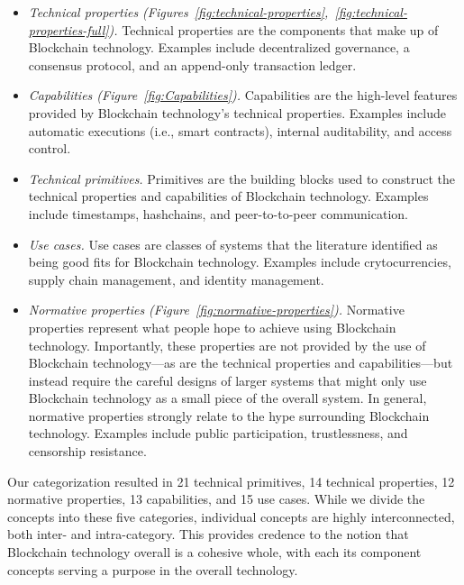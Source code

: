 \begin{itemize}
	\item \emph{Technical properties (Figures~\ref{fig:technical-properties},~\ref{fig:technical-properties-full}).}
	Technical properties are the components that make up of Blockchain technology. Examples include decentralized governance, a consensus protocol, and an append-only transaction ledger.
	
	\item \emph{Capabilities (Figure~\ref{fig:Capabilities}).}
	Capabilities are the high-level features provided by Blockchain technology's technical properties. Examples include automatic executions (i.e., smart contracts), internal auditability, and access control.
	
	\item \emph{Technical primitives.}
	Primitives are the building blocks used to construct the technical properties and capabilities of Blockchain technology. Examples include timestamps, hashchains, and peer-to-to-peer communication.
	
	\item \emph{Use cases.}
	Use cases are classes of systems that the literature identified as being good fits for Blockchain technology. Examples include crytocurrencies, supply chain management, and identity management.
	
	\item \emph{Normative properties (Figure~\ref{fig:normative-properties}).}
	Normative properties represent what people hope to achieve using Blockchain technology. 
	Importantly, these properties are not provided by the use of Blockchain technology---as are the technical properties and capabilities---but instead require the careful designs of larger systems that might only use Blockchain technology as a small piece of the overall system.
	In general, normative properties strongly relate to the hype surrounding Blockchain technology.
	Examples include public participation, trustlessness, and censorship resistance.
		
\end{itemize}

Our categorization resulted in 21 technical primitives, 14 technical properties, 12 normative properties, 13 capabilities, and 15 use cases.
While we divide the concepts into these five categories, individual concepts are highly interconnected, both inter- and intra-category.
This provides credence to the notion that Blockchain technology overall is a cohesive whole, with each its component concepts serving a purpose in the overall technology.

